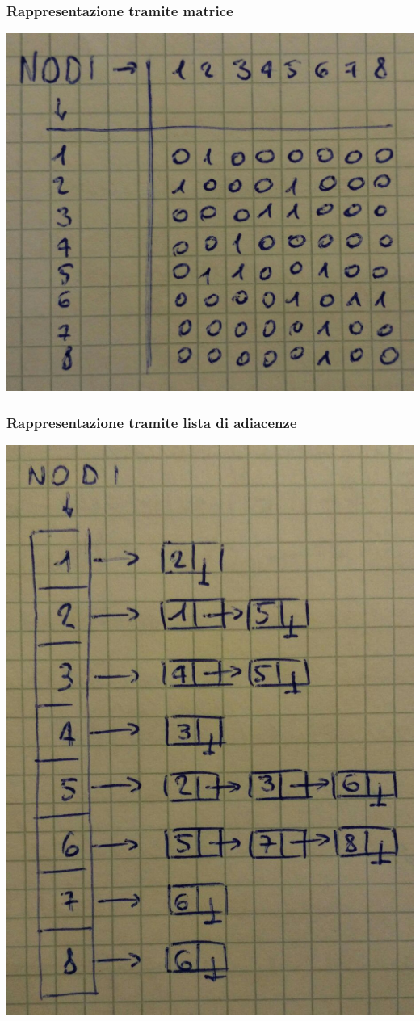 \subsubsection{Rappresentazione tramite matrice}
\begin{center}
    \includegraphics[width=.4\textwidth]{res/rappresentazione-matrice.jpg} \hfill
\end{center}
\subsubsection{Rappresentazione tramite lista di adiacenze}
\begin{center}
    \includegraphics[width=.4\textwidth]{res/rappresentazione-lista-adiacenze.jpg} \hfill
\end{center}